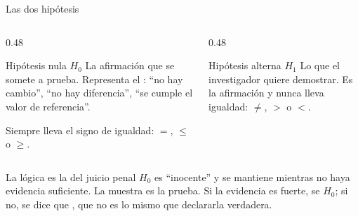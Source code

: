 \documentclass[aspectratio=169,10pt]{beamer}
\begin{document}
\begin{frame}{Las dos hipótesis}
  \begin{columns}[T,onlytextwidth]
    \begin{column}{0.48\textwidth}
      \begin{block}{Hipótesis nula $H_0$}
        \footnotesize
        La afirmación que se somete a prueba. Representa el
        : ``no hay cambio'', ``no hay diferencia'', ``se cumple
        el valor de referencia''.

        \vspace{0.1cm}
        Siempre lleva el signo de igualdad: $=$, $\le$ o $\ge$.
      \end{block}
    \end{column}
    \begin{column}{0.48\textwidth}
      \begin{exampleblock}{Hipótesis alterna $H_1$}
        \footnotesize
        Lo que el investigador quiere demostrar. Es la afirmación
         y nunca lleva igualdad: $\neq$, $>$ o $<$.
      \end{exampleblock}
    \end{column}
  \end{columns}

  \vspace{0.25cm}
  \begin{alertblock}{La lógica es la del juicio penal}
    \footnotesize
    $H_0$ es ``inocente'' y se mantiene mientras no haya evidencia suficiente.
    La muestra es la prueba. Si la evidencia es fuerte, se 
    $H_0$; si no, se dice que , que no es lo mismo que declararla verdadera.
  \end{alertblock}
\end{frame}
\end{document}
